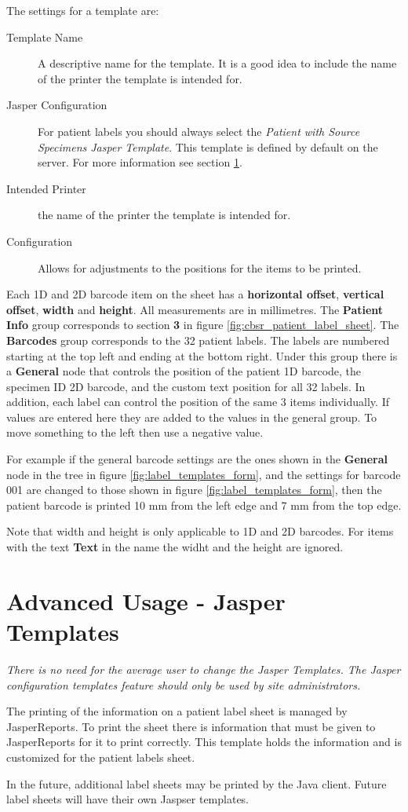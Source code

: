 The settings for a template are:
\begin{description}
\item[Template Name] A descriptive name for the template. It is a good idea to
  include the name of the printer the template is intended for.
\item[Jasper Configuration] For patient labels you should always select the
\emph{Patient with Source Specimens Jasper Template}. This template is defined
by default on the server. For more information see section \ref{sec:jasper_templates}.
\item[Intended Printer] the name of the printer the template is intended for.
\item[Configuration] Allows for adjustments to the positions for the items to be printed.
\end{description}

Each 1D and 2D barcode item on the sheet has a \textbf{horizontal offset},
\textbf{vertical offset}, \textbf{width} and \textbf{height}. All measurements
are in millimetres. The \textbf{Patient Info} group corresponds to section
\textbf{3} in figure \ref{fig:cbsr_patient_label_sheet}. The \textbf{Barcodes}
group corresponds to the 32 patient labels. The labels are numbered starting at
the top left and ending at the bottom right. Under this group there is a
\textbf{General} node that controls the position of the patient 1D barcode, the
specimen ID 2D barcode, and the custom text position for all 32 labels. In
addition, each label can control the position of the same 3 items
individually. If values are entered here they are added to the values in the
general group. To move something to the left then use a negative value.

For example if the general barcode settings are the ones shown in the
\textbf{General} node in the tree in figure \ref{fig:label_templates_form}, and
the settings for barcode 001 are changed to those shown in figure
\ref{fig:label_templates_form}, then the patient barcode is printed 10 mm from
the left edge and 7 mm from the top edge.

Note that width and height is only applicable to 1D and 2D barcodes. For items
with the text \textbf{Text} in the name the widht and the height are ignored.

\section{Advanced Usage - Jasper Templates}
\label{sec:jasper_templates}

\emph{There is no need for the average user to change the Jasper
  Templates. The Jasper configuration templates feature should only be used by
site administrators.}

The printing of the information on a patient label sheet is managed by
JasperReports. To print the sheet there is information that must be given to
JasperReports for it to print correctly. This template holds the information and
is customized for the patient labels sheet.

In the future, additional label sheets may be printed by the Java client. Future
label sheets will have their own Jaspser templates.

